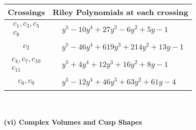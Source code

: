 \documentclass[1p]{elsarticle_modified}
\theoremstyle{definition}
\begin{document}
\begin{tabular}{m{50pt}|m{274pt}}
Crossings & \hspace{64pt}Riley Polynomials at each crossing \\
\hline $$\begin{aligned}c_{1},c_{3},c_{5}\\c_{8}\end{aligned}$$&$\begin{aligned}
&y^5-10 y^4+27 y^3-6 y^2+5 y-1
\end{aligned}$\\
\hline $$\begin{aligned}c_{2}\end{aligned}$$&$\begin{aligned}
&y^5-46 y^4+619 y^3+214 y^2+13 y-1
\end{aligned}$\\
\hline $$\begin{aligned}c_{4},c_{7},c_{10}\\c_{11}\end{aligned}$$&$\begin{aligned}
&y^5+4 y^4+12 y^3+16 y^2+8 y-1
\end{aligned}$\\
\hline $$\begin{aligned}c_{6},c_{9}\end{aligned}$$&$\begin{aligned}
&y^5-12 y^4+46 y^3+63 y^2+61 y-4
\end{aligned}$\\
\hline
\end{tabular}\\~\\
\newpage\flushleft \textbf{(vi) Complex Volumes and Cusp Shapes}
\end{document}
